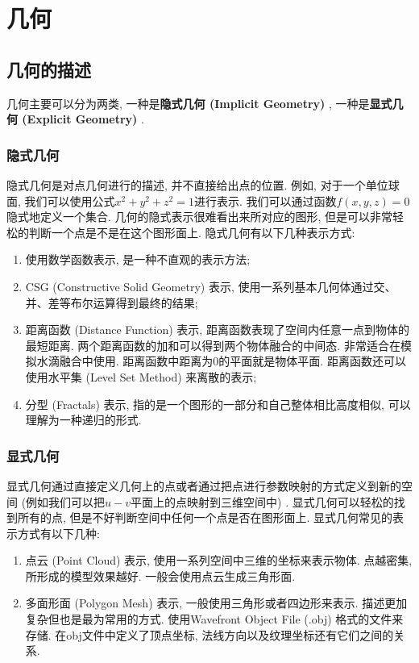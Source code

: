 \part{几何}
\chapter{几何的描述}

几何主要可以分为两类, 一种是\textbf{隐式几何 (Implicit Geometry) }, 一种是\textbf{显式几何 (Explicit Geometry) }. 

\section{隐式几何}
隐式几何是对点几何进行的描述, 并不直接给出点的位置. 例如, 对于一个单位球面, 我们可以使用公式$x^2+y^2+z^2=1$进行表示. 我们可以通过函数$f(x,y,z)=0$隐式地定义一个集合. 
几何的隐式表示很难看出来所对应的图形, 但是可以非常轻松的判断一个点是不是在这个图形面上. 隐式几何有以下几种表示方式: 
\begin{enumerate}
	\item 使用数学函数表示, 是一种不直观的表示方法; 
	\item CSG (Constructive Solid Geometry) 表示, 使用一系列基本几何体通过交、并、差等布尔运算得到最终的结果; 
	\item 距离函数 (Distance Function) 表示, 距离函数表现了空间内任意一点到物体的最短距离. 两个距离函数的加和可以得到两个物体融合的中间态. 非常适合在模拟水滴融合中使用. 距离函数中距离为0的平面就是物体平面. 距离函数还可以使用水平集 (Level Set Method) 来离散的表示; 
	\item 分型 (Fractals) 表示, 指的是一个图形的一部分和自己整体相比高度相似, 可以理解为一种递归的形式. 
\end{enumerate}

\section{显式几何}
显式几何通过直接定义几何上的点或者通过把点进行参数映射的方式定义到新的空间 (例如我们可以把$u-v$平面上的点映射到三维空间中) . 显式几何可以轻松的找到所有的点, 但是不好判断空间中任何一个点是否在图形面上. 显式几何常见的表示方式有以下几种: 
\begin{enumerate}
	\item 点云 (Point Cloud) 表示, 使用一系列空间中三维的坐标来表示物体. 点越密集, 所形成的模型效果越好. 一般会使用点云生成三角形面. 
	\item 多面形面 (Polygon Mesh) 表示, 一般使用三角形或者四边形来表示. 描述更加复杂但也是最为常用的方式. 使用Wavefront Object File (.obj) 格式的文件来存储. 在obj文件中定义了顶点坐标, 法线方向以及纹理坐标还有它们之间的关系. 
\end{enumerate}

